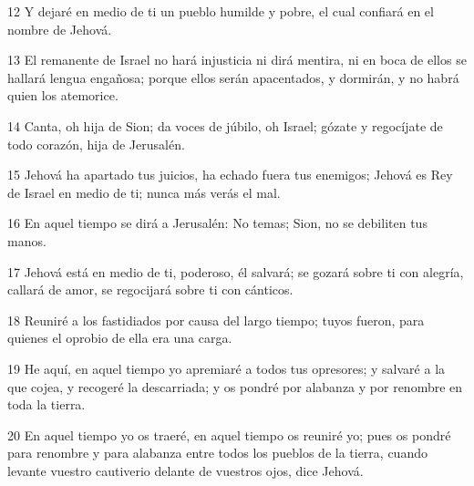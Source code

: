 \par 12 Y dejaré en medio de ti un pueblo humilde y pobre, el cual confiará en el nombre de Jehová.
\par 13 El remanente de Israel no hará injusticia ni dirá mentira, ni en boca de ellos se hallará lengua engañosa; porque ellos serán apacentados, y dormirán, y no habrá quien los atemorice.
\par 14 Canta, oh hija de Sion; da voces de júbilo, oh Israel; gózate y regocíjate de todo corazón, hija de Jerusalén.
\par 15 Jehová ha apartado tus juicios, ha echado fuera tus enemigos; Jehová es Rey de Israel en medio de ti; nunca más verás el mal.
\par 16 En aquel tiempo se dirá a Jerusalén: No temas; Sion, no se debiliten tus manos.
\par 17 Jehová está en medio de ti, poderoso, él salvará; se gozará sobre ti con alegría, callará de amor, se regocijará sobre ti con cánticos.
\par 18 Reuniré a los fastidiados por causa del largo tiempo; tuyos fueron, para quienes el oprobio de ella era una carga.
\par 19 He aquí, en aquel tiempo yo apremiaré a todos tus opresores; y salvaré a la que cojea, y recogeré la descarriada; y os pondré por alabanza y por renombre en toda la tierra.
\par 20 En aquel tiempo yo os traeré, en aquel tiempo os reuniré yo; pues os pondré para renombre y para alabanza entre todos los pueblos de la tierra, cuando levante vuestro cautiverio delante de vuestros ojos, dice Jehová.

